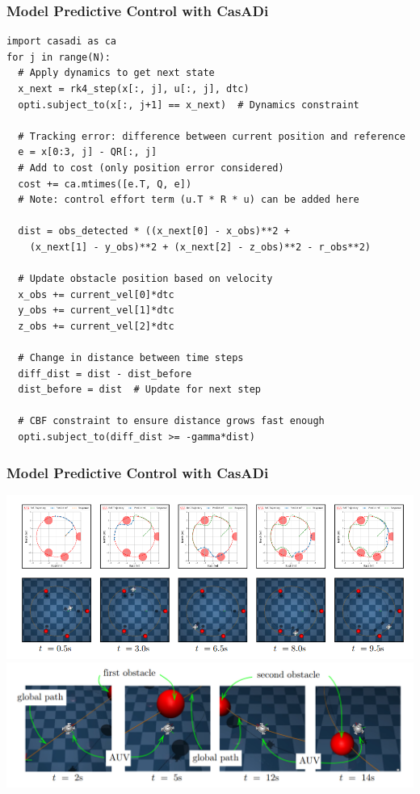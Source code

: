 \documentclass[9pt]{beamer}
\begin{document}
		\begin{frame}[fragile]
			\frametitle{Model Predictive Control with CasADi}
			\begin{verbatim}
import casadi as ca
for j in range(N):
  # Apply dynamics to get next state
  x_next = rk4_step(x[:, j], u[:, j], dtc)
  opti.subject_to(x[:, j+1] == x_next)  # Dynamics constraint

  # Tracking error: difference between current position and reference
  e = x[0:3, j] - QR[:, j]
  # Add to cost (only position error considered)
  cost += ca.mtimes([e.T, Q, e])
  # Note: control effort term (u.T * R * u) can be added here

  dist = obs_detected * ((x_next[0] - x_obs)**2 + 
    (x_next[1] - y_obs)**2 + (x_next[2] - z_obs)**2 - r_obs**2)

  # Update obstacle position based on velocity
  x_obs += current_vel[0]*dtc
  y_obs += current_vel[1]*dtc
  z_obs += current_vel[2]*dtc

  # Change in distance between time steps
  diff_dist = dist - dist_before
  dist_before = dist  # Update for next step

  # CBF constraint to ensure distance grows fast enough
  opti.subject_to(diff_dist >= -gamma*dist)
			\end{verbatim}
		\end{frame}
	
		\begin{frame}
			\frametitle{Model Predictive Control with CasADi}
			\begin{center}
				\includegraphics[width=0.9\linewidth, fbox]{images/mjc-odin1m.png}
				\includegraphics[width=0.9\linewidth, fbox]{images/mjc-odin3.png}
			\end{center}
		\end{frame}
	
\end{document}
